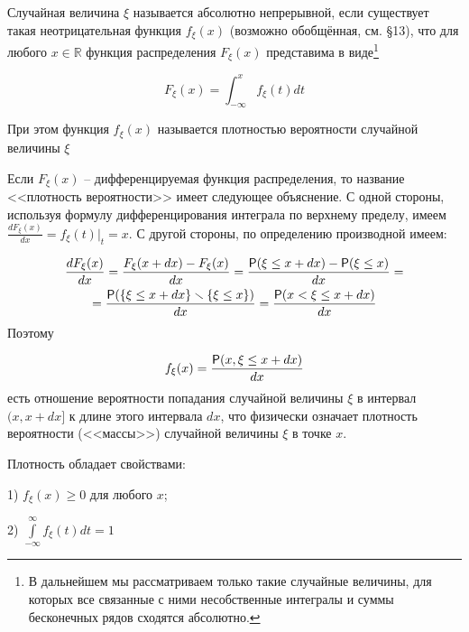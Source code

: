 \begin{definition}
\label{def:12.1}
	Случайная величина $\xi$ называется абсолютно непрерывной, если существует такая неотрицательная функция $f_{\xi} (x)$ (возможно обобщённая, см. §13), что для любого $x \in \mathbb{R}$ функция распределения $F_{\xi}(x)$ представима в виде\footnote{В дальнейшем мы рассматриваем только такие случайные величины, для которых все связанные с
ними несобственные интегралы и суммы бесконечных рядов сходятся абсолютно.
	}
  
\begin{equation*}
	F_{\xi}(x)=\int_{-\infty}^{x} f_{\xi}(t) dt  	
\end{equation*}

При этом функция $f_{\xi}(x)$ называется плотностью вероятности случайной величины $\xi$
\end{definition}

\begin{zam}
\label{zam:12.2}
Если $F_{\xi}(x)$ -- дифференцируемая функция распределения, то название <<плотность вероятности>> имеет следующее объяснение. С одной стороны, используя формулу дифференцирования интеграла по верхнему пределу, имеем $\frac{dF_{\xi}(x)}{dx}=f_{\xi}(t)|_t=x$. С другой стороны, по определению производной имеем:

\begin{gather*}
	\frac{dF_{\xi}(x)}{dx} = \frac{F_{\xi}(x+dx)-F_{\xi}(x)}{dx}=\frac{\P(\xi \leq x+dx)-\P(\xi \leq x)}{dx}=\\=\frac{\P(\{\xi \leq x+dx \}\ssm \{\xi \leq x\})}{dx} = \frac{\P(x<\xi \leq x+dx)}{dx}
\end{gather*}
Поэтому

\begin{equation*}
	f_{\xi}(x)=\frac{\P(x,\xi \leq x+dx)}{dx}	 
\end{equation*}
есть отношение вероятности попадания случайной величины $\xi$ в интервал $(x, x+dx]$ к длине этого интервала $dx$, что физически означает плотность вероятности (<<массы>>) случайной величины $\xi$ в точке $x$.
\end{zam}
 

 \begin{theorem}
 \label{th:12.3}
Плотность обладает свойствами:

1) $f_{\xi}(x) \geq 0$ для любого $x$;

2) $\int\limits_{-\infty}^{\infty} f_{\xi}(t)dt=1$
 \end{theorem}

